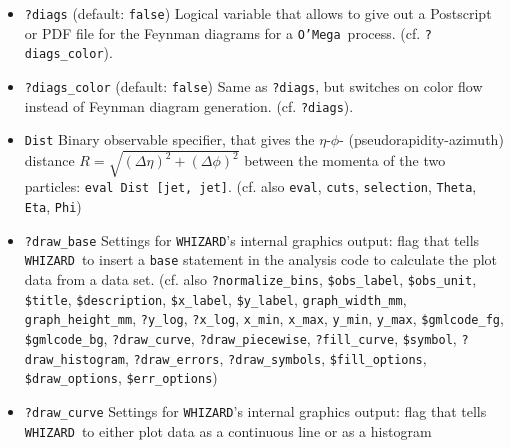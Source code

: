 \documentclass[12pt]{book}
\newcommand{\ttt}[1]{\texttt{#1}}
\newcommand{\whizard}{\texttt{WHIZARD}}
\newcommand{\oMega}{\texttt{O'Mega}}
\begin{document}
\begin{itemize}
Flag that -- in case of using factorized production and decays using
the ($\to$) \ttt{unstable} command -- tells \whizard\ instead of full
spin correlations to take only the diagonal entries in the
spin-density matrix (i.e. classical spin correlations). (cf. also 
\ttt{?decay\_rest\_frame}, \ttt{?auto\_decays},
\ttt{auto\_decays\_multiplicity}, \ttt{?auto\_decays\_radiative},
\newline \ttt{?isotropic\_decay})
\item
\ttt{?diags} \qquad (default: \ttt{false}) \newline
Logical variable that allows to give out a Postscript or PDF file 
for the Feynman diagrams for a \oMega\ process. (cf. \ttt{?diags\_color}). 
\item
\ttt{?diags\_color} \qquad (default: \ttt{false}) \newline
Same as \ttt{?diags}, but switches on color flow instead of Feynman
diagram generation. (cf. \ttt{?diags}). 
\item
\ttt{Dist} \newline
Binary observable specifier, that gives the $\eta$-$\phi$-
(pseudorapidity-azimuth) distance $R = \sqrt{(\Delta \eta)^2 +
(\Delta\phi)^2}$ between the momenta of the two particles: \ttt{eval
Dist [jet, jet]}. (cf. also \ttt{eval}, \ttt{cuts}, \ttt{selection},
\ttt{Theta}, \ttt{Eta}, \ttt{Phi})  
\item
\ttt{?draw\_base} \newline
Settings for \whizard's internal graphics output: flag that tells
\whizard\ to insert a \ttt{base} statement in the analysis code to
calculate the plot data from a data set. (cf. also
\ttt{?normalize\_bins}, \ttt{\$obs\_label}, \ttt{\$obs\_unit}, 
\ttt{\$title}, \ttt{\$description}, \ttt{\$x\_label},
\ttt{\$y\_label}, \ttt{graph\_width\_mm}, \ttt{graph\_height\_mm},
\ttt{?y\_log}, \ttt{?x\_log}, \ttt{x\_min}, \ttt{x\_max}, 
\ttt{y\_min}, \ttt{y\_max}, \newline \ttt{\$gmlcode\_fg}, \ttt{\$gmlcode\_bg},
\ttt{?draw\_curve}, \ttt{?draw\_piecewise},
\ttt{?fill\_curve}, \ttt{\$symbol}, \newline \ttt{?draw\_histogram},
\ttt{?draw\_errors}, \ttt{?draw\_symbols}, \ttt{\$fill\_options},
\ttt{\$draw\_options}, \newline \ttt{\$err\_options})
\item
\ttt{?draw\_curve} \newline
Settings for \whizard's internal graphics output: flag that tells
\whizard\ to either plot data as a continuous line or as a histogram

\end{itemize}
\end{document}
